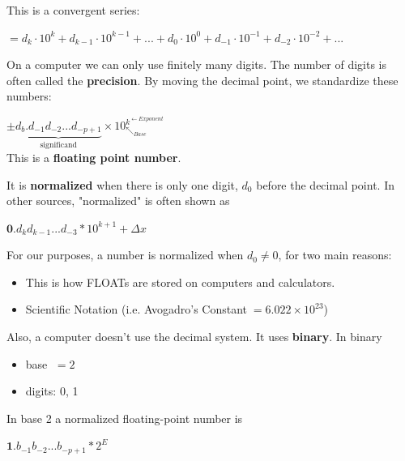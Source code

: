 \documentclass[a4paper,12pt]{report}
\begin{document}
	This is a convergent series:

\begin{center}
	$=d_k\cdot10^k+d_{k-1}\cdot10^{k-1}+...+d_0\cdot10^0+d_{-1}\cdot10^{-1}+d_{-2}
		\cdot10^{-2}+...$
\end{center}

	On a computer we can only use finitely many digits.  The number of digits is often called the 
	\textbf{precision}. By moving the decimal point, we standardize these numbers:\\

\begin{center}
\fbox
{
	\parbox{0.5\textwidth}
	{
		\begin{center}
		$\pm \underbrace{d_b.d_{-1}d_{-2}...d_{-p+1}}_{\text{significand}}
			\times10_{\nwarrow_{ Base}}^{k^{\leftarrow Exponent}}$\\
		This is a \textbf{floating point number}.
		\end{center}
	}
}
\end{center}

	It is \textbf{normalized} when there is only one digit, $d_0$ before the decimal point.
	In  other sources, "normalized" is often shown as

\begin{center}
	$\textbf{0}.d_k d_{k-1} ... d_{-3} * 10^{k+1}+ \Delta x$
\end{center}

	For our purposes, a number is normalized when $d_0 \neq 0$, for two main reasons:

\begin{itemize}
	\item This is how FLOATs are stored on computers and calculators.
	\item Scientific Notation (i.e. Avogadro's Constant$\; =6.022 \times 10^{23}$)\\
\end{itemize}

	Also, a computer doesn't use the decimal system.  It uses \textbf{binary}. In binary

\begin{itemize}
	\item base $\; = 2$
	\item digits: 0, 1
\end{itemize}

	In base 2 a normalized floating-point number is

\begin{center}
	$\textbf{1}.b_{-1}b_{-2}...b_{-p+1}*2^E$
\end{center}
\end{document}
